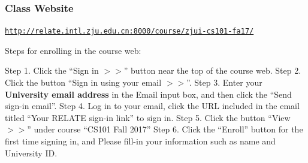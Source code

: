 \documentclass[11pt]{beamer}
\begin{document}
\begin{frame}[plain,c]
  \frametitle{Class Website}
  \Enlarge

  \begin{center}
    \textcolor{\CSBase}{\small \texttt{\url{http://relate.intl.zju.edu.cn:8000/course/zjui-cs101-fa17/}}}
  \end{center}
     Steps for enrolling in the course web:
     \begin{itemize}
     	\myitem Step 1. Click the ``Sign in $>>$'' button near the top of the course web.
     	\myitem Step 2. Click the button ``Sign in using your email $>>$''.   	
     	\myitem Step 3. Enter your \textbf{University email address} in the Email input box, and then click the ``Send sign-in email''.
     	\myitem Step 4. Log in to your email, click the URL included in the email titled ``Your RELATE sign-in link'' to sign in.
     	\myitem Step 5. Click the button ``View$>>$'' under course ``CS101 Fall 2017''
     	\myitem \large{Step 6. Click the ``Enroll'' button for the first time signing in, and Please fill-in your information such as name and University ID.}
     \end{itemize}
\end{frame}
\end{document}
